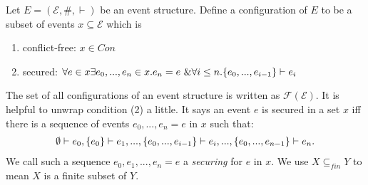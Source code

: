 \begin{definition}[Configuration]
    \label{conf}
    Let $E = (\mathcal{E},\#,\vdash)$ be an event structure.
    Define a configuration of $E$ to be a subset of events $x \subseteq \mathcal{E}$ which is
    \begin{enumerate}
        \item conflict-free: $x \in Con$
        \item secured: $\forall e \in x \exists e_0,...,e_n \in x. e_n = e \ \& 
        \forall i \leq n. \{e_0,...,e_{i-1}\} \vdash e_i$
    \end{enumerate}
\end{definition}
The set of all configurations of an event structure is written as $\mathcal{F(E)}$.
It is helpful to unwrap condition (2) a little. It says an event $e$ is secured in a set $x$
iff there is a sequence of events $e_0,...,e_n = e$ in $x$ such that:
\begin{align*}
    \emptyset \vdash e_0, \{e_0\} \vdash e_1, ..., \{e_0,...,e_{i-1}\} \vdash e_i,...,
    \{e_0,...,e_{n-1}\} \vdash e_n.
\end{align*}
We call such a sequence $e_0,e_1,...,e_n = e$ a \emph{securing} for $e$ in $x$.
We use $X \subseteq_{fin} Y$ to mean $X$ is a finite subset of $Y$.

